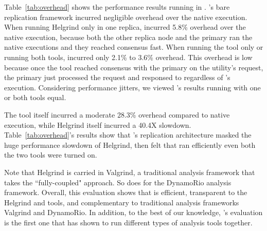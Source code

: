 Table~\ref{tab:overhead} shows the performance results running \clamav in 
\xxx. \xxx's bare replication framework incurred negligible overhead over 
the native execution. When running Helgrind only in one 
replica, \xxx incurred 5.8\% overhead over the native execution, because both 
the other replica node and the primary ran the native executions and they 
reached consensus fast. When running the \drcov tool only or running both 
tools, \xxx incurred only 2.1\% to 3.6\% overhead. This overhead is low because once the \drcov tool 
reached consensus with the primary on the \clamdscan utility's request, the 
primary just processed the request and responsed to \clamdscan regardless of 
\drcov's execution. Considering performance jitters, we viewed \xxx's 
results running with one or both tools equal.

The \drcov tool itself incurred a moderate 28.3\% overhead compared to native 
execution, while Helgrind itself incurred a 40.4X slowdown. 
Table~\ref{tab:overhead}'s results show that \xxx's replication architecture 
masked the huge performance slowdown of Helgrind, then \clamdscan felt that 
\clamav ran efficiently even both the two tools were turned on.

Note that Helgrind is carried in Valgrind, a traditional analysis 
framework that takes the ``fully-coupled" approach. So does \drcov for the 
DynamoRio analysis framework. Overall, this evaluation shows that \xxx is 
efficient, transparent to the 
Helgrind and \drcov tools, and complementary to traditional analysis frameworks 
Valgrind and DynamoRio. In addition, to the best of our knowledge, \xxx's 
evaluation is the first one that has shown to run different types of analysis 
tools together.

